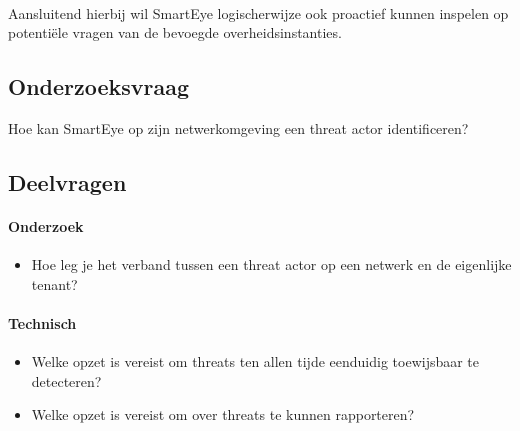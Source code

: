 \paragraph{}
Aansluitend hierbij wil SmartEye logischerwijze ook proactief kunnen inspelen op potentiële vragen van de bevoegde overheidsinstanties.

\subsection{Onderzoeksvraag}
Hoe kan SmartEye op zijn netwerkomgeving een threat actor identificeren?

\subsection{Deelvragen}
\paragraph{Onderzoek}
\begin{itemize}
    \item Hoe leg je het verband tussen een threat actor op een netwerk en de eigenlijke tenant?
\end{itemize}

\paragraph{Technisch}
\begin{itemize}
    \item Welke opzet is vereist om threats ten allen tijde eenduidig toewijsbaar te detecteren?
    \item Welke opzet is vereist om over threats te kunnen rapporteren?
\end{itemize}




